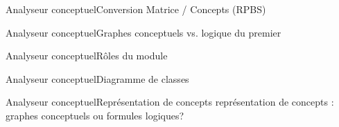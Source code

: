 \begin{frame}{Analyseur conceptuel}{Conversion Matrice / Concepts}
(RPBS)
\end{frame}

\begin{frame}{Analyseur conceptuel}{Graphes conceptuels vs. logique du premier}

\end{frame}

\begin{frame}{Analyseur conceptuel}{Rôles du module}

\end{frame}

\begin{frame}{Analyseur conceptuel}{Diagramme de classes}

\end{frame}

\begin{frame}{Analyseur conceptuel}{Représentation de concepts}
représentation de concepts : graphes conceptuels ou formules logiques?
\end{frame}